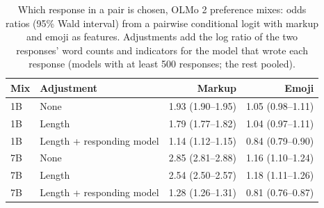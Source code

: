 \begin{table}[t]
\centering
\small
\caption{Which response in a pair is chosen, OLMo 2 preference mixes: odds ratios (95\% Wald interval) from a pairwise conditional logit with markup and emoji as features. Adjustments add the log ratio of the two responses' word counts and indicators for the model that wrote each response (models with at least 500 responses; the rest pooled).}
\label{tab:preference-adjusted}
\begin{tabular}{llrr}
\toprule
Mix & Adjustment & Markup & Emoji \\
\midrule
1B & None & 1.93 (1.90--1.95) & 1.05 (0.98--1.11) \\
1B & Length & 1.79 (1.77--1.82) & 1.04 (0.97--1.11) \\
1B & Length + responding model & 1.14 (1.12--1.15) & 0.84 (0.79--0.90) \\
7B & None & 2.85 (2.81--2.88) & 1.16 (1.10--1.24) \\
7B & Length & 2.54 (2.50--2.57) & 1.18 (1.11--1.26) \\
7B & Length + responding model & 1.28 (1.26--1.31) & 0.81 (0.76--0.87) \\
\bottomrule
\end{tabular}
\end{table}
